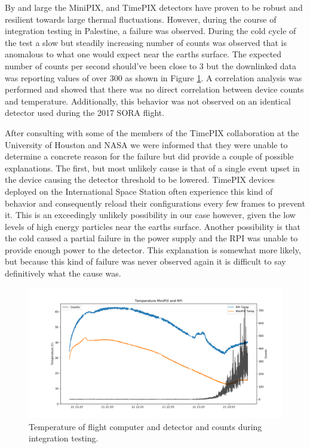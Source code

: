 By and large the MiniPIX, and TimePIX detectors have proven to be robust and resilient towards large thermal fluctuations. However, during the course of integration testing in Palestine, a failure was observed. During the cold cycle of the test a slow but steadily increasing number of counts was observed that is anomalous to what one would expect near the earths surface. The expected number of counts per second should've been close to 3 but the downlinked data was reporting values of over 300 as shown in Figure \ref{fig:integrationtemps}.
A correlation analysis was performed and showed that there was no direct correlation between device counts and temperature. Additionally, this behavior was not observed on an identical detector used during the 2017 SORA flight. 

After consulting with some of the members of the TimePIX collaboration at the University of Houston and NASA we were informed that they were unable to determine a concrete reason for the failure but did provide a couple of possible explanations. The first, but most unlikely cause is that of a single event upset in the device causing the detector threshold to be lowered. TimePIX devices deployed on the International Space Station often experience this kind of behavior and consequently reload their configurations every few frames to prevent it. This is an exceedingly unlikely possibility in our case however, given the low levels of high energy particles near the earths surface. Another possibility is that the cold caused a partial failure in the power supply and the RPI was unable to provide enough power to the detector. This explanation is somewhat more likely, but because this kind of failure was never observed again it is difficult to say definitively what the cause was.

\begin{figure}[H]
	\begin{center}
	\includegraphics[width=\textwidth]{figures/tempsandcountsvtime.png}
	\caption{Temperature of flight computer and detector and counts during integration testing.}
	\label{fig:integrationtemps}
	\end{center}
\end{figure}

